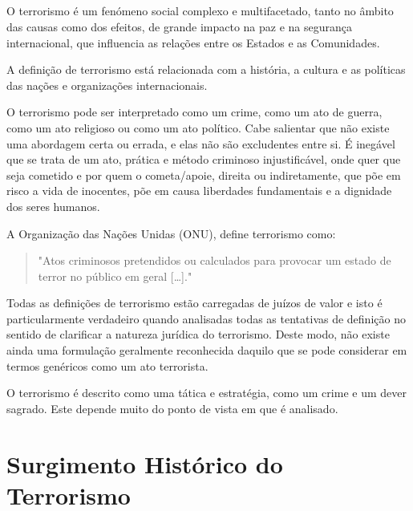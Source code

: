 \documentclass{report}
\begin{document}
\paragraph{} O terrorismo é um fenómeno social complexo e multifacetado, tanto no âmbito das causas como dos efeitos, de grande impacto na paz e na segurança internacional, que influencia as relações entre os Estados e as Comunidades.\par
A definição de terrorismo está relacionada com a história, a cultura e as políticas das nações e organizações internacionais.\par
O terrorismo pode ser interpretado como um crime, como um ato de guerra, como um ato religioso ou como um ato político. Cabe salientar que não existe uma abordagem certa ou errada, e elas não são excludentes entre si. É inegável que se trata de um ato, prática e método criminoso injustificável, onde quer que seja cometido e por quem o cometa/apoie, direita ou indiretamente, que põe em risco a vida de inocentes, põe em causa liberdades fundamentais e a dignidade dos seres humanos.\par
A Organização das Nações Unidas (ONU), define terrorismo como:
\begin {quotation}
"Atos criminosos pretendidos ou calculados para provocar um estado de terror no público em geral […]."
\end {quotation}
\par
Todas as definições de terrorismo estão carregadas de juízos de valor e isto é particularmente verdadeiro quando analisadas todas as tentativas de definição no sentido de clarificar a natureza jurídica do terrorismo. Deste modo, não existe ainda uma formulação geralmente reconhecida daquilo que se pode considerar em termos genéricos como um ato terrorista. \par  
O terrorismo é descrito como uma tática e estratégia, como um crime e um dever sagrado.  Este depende muito do ponto de vista em que é analisado. 


\chapter{Surgimento Histórico do Terrorismo}
\label{chap.Surgimento Histórico do Terrorismo}
\end{document}
